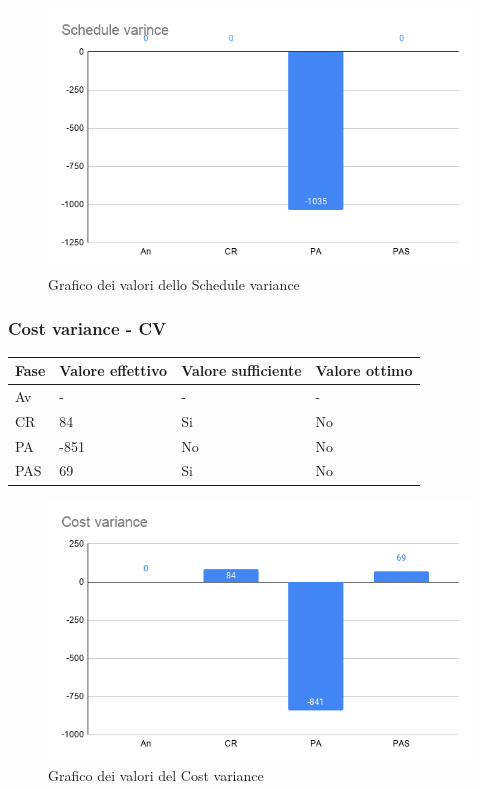     \begin{figure}[H]
        \centering
        \includegraphics[width=10 cm]{source/sections/images/schedule_variance.png}
        \caption{Grafico dei valori dello Schedule variance}
    \end{figure}


\subsubsection{Cost variance - CV}
\begin{longtabu} to \textwidth {| X[0.1,c m] | X[0.1,c m] | X[0.1,c m] | X[0.1,c m]|}
    \hline
    \textbf{Fase} &
    \textbf{Valore effettivo} & 
    \textbf{Valore sufficiente} & 
    \textbf{Valore ottimo} \\
    \hline
    Av & - & - & - \\ 
    \hline
    CR & 84 & Si & No \\
    \hline
    PA & -851 & No & No \\
    \hline 
    PAS & 69 & Si & No \\
    \hline
    \end{longtabu}

    \begin{figure}[H]
        \centering
        \includegraphics[width=10 cm]{source/sections/images/cost_variance.png}
        \caption{Grafico dei valori del Cost variance}
    \end{figure}
    

